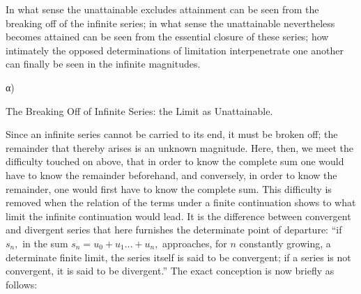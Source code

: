 \documentclass[12pt,a4paper,openany]{book}
\newcommand{\opage}[1]{\marginnote{\footnotesize\textit{[#1]}}}
\begin{document}
In what sense the unattainable excludes attainment can be seen from the breaking off of the infinite series; in what sense the unattainable nevertheless becomes attained can be seen from the essential closure of these series; how intimately the opposed determinations of limitation interpenetrate one another can finally be seen in the infinite magnitudes.

\begin{center}α)

The Breaking Off of Infinite Series: the Limit as Unattainable.\end{center}

Since an infinite series cannot be carried to its end, it must be broken off; the remainder that thereby arises is an
\setcounter{footnote}{0}%
\opage{61}unknown magnitude. Here, then, we meet the difficulty touched on above, that in order to know the complete sum one would have to know the remainder beforehand, and conversely, in order to know the remainder, one would first have to know the complete sum. This difficulty is removed when the relation of the terms under a finite continuation shows to what limit the infinite continuation would lead. It is the difference between convergent and divergent series that here furnishes the determinate point of departure: ``if $s_{n},$ in the sum $s_{n}=u_{0}+u_{1}\ldots+u_{n},$ approaches, for $n$ constantly growing, a determinate finite limit, the series itself is said to be convergent; if a series is not convergent, it is said to be divergent.'' The exact conception is now briefly as follows:
\end{document}
